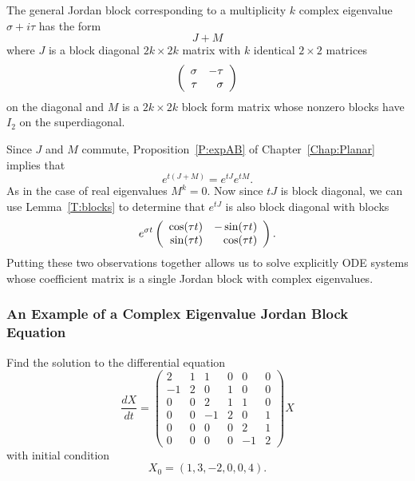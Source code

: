 The general Jordan block corresponding to a multiplicity $k$ complex
eigenvalue $\sigma+i\tau$ has the form 
\begin{equation} \label{e:JM}
J + M
\end{equation}
where $J$ is a block diagonal 
$2k\times 2k$ matrix with $k$ identical $2\times 2$ matrices 
\[
\left(\begin{array}{rr} \sigma & -\tau\\ \tau &\sigma\end{array}\right)
\]
on the diagonal and $M$ is a $2k\times 2k$ block form matrix 
whose nonzero blocks have $I_2$ on the superdiagonal.

Since $J$ and $M$ commute, Proposition~\ref{P:expAB} of 
Chapter~\ref{Chap:Planar} implies that
\[
e^{t(J+M)} = e^{tJ} e^{tM}.
\]
As in the case of real eigenvalues $M^k=0$.  Now since $tJ$ is block 
diagonal, we can use Lemma~\ref{T:blocks} to determine that $e^{tJ}$ 
is also block diagonal with blocks 
\[
e^{\sigma t}\left(\begin{array}{rr} \cos(\tau t) & -\sin(\tau t)\\ \sin(\tau t) &\cos(\tau t)\end{array}\right).
\]
Putting these two observations together allows us to solve explicitly 
ODE systems whose coefficient matrix
is a single Jordan block with complex eigenvalues.



\subsubsection*{An Example of a Complex Eigenvalue Jordan Block Equation}

Find the solution to the differential equation 
\[
\frac{dX}{dt} = \left(\begin{array}{rr|rr|rr} 
 2 & 1 & 1 & 0 & 0 & 0\\
-1 & 2 & 0 & 1 & 0 & 0 \\  
 \hline
 0 & 0 & 2 & 1 & 1 & 0 \\
 0 & 0 &-1 & 2 & 0 & 1 \\
\hline
 0 & 0 & 0 & 0 & 2 & 1\\
 0 & 0 & 0 & 0 &-1 & 2  \end{array}\right) X
\]
with initial condition
\[
X_0 = (1, 3, -2, 0, 0, 4).
\]

